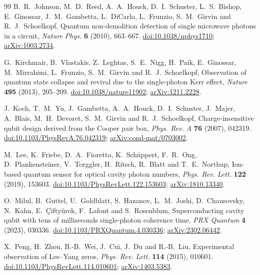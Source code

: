\documentclass[11pt,reqno]{amsart}
\numberwithin{equation}{section}
\theoremstyle{plain}
\theoremstyle{definition}
\theoremstyle{remark}
\begin{document}
\begin{thebibliography}{99}
B.~R.~Johnson, M.~D.~Reed, A.~A.~Houck, D.~I.~Schuster, L.~S.~Bishop, E.~Ginossar, J.~M.~Gambetta, L.~DiCarlo, L.~Frunzio, S.~M.~Girvin and R.~J.~Schoelkopf, Quantum non-demolition detection of single microwave photons in a circuit, \emph{Nature Phys.} \textbf{6} (2010), 663--667.
\href{https://doi.org/10.1038/nphys1710}{doi:10.1038/nphys1710};
\href{https://arxiv.org/abs/1003.2734}{arXiv:1003.2734}.

G.~Kirchmair, B.~Vlastakis, Z.~Leghtas, S.~E.~Nigg, H.~Paik, E.~Ginossar, M.~Mirrahimi, L.~Frunzio, S.~M.~Girvin and R.~J.~Schoelkopf, Observation of quantum state collapse and revival due to the single-photon Kerr effect, \emph{Nature} \textbf{495} (2013), 205--209.
\href{https://doi.org/10.1038/nature11902}{doi:10.1038/nature11902};
\href{https://arxiv.org/abs/1211.2228}{arXiv:1211.2228}.

J.~Koch, T.~M.~Yu, J.~Gambetta, A.~A.~Houck, D.~I.~Schuster, J.~Majer, A.~Blais, M.~H.~Devoret, S.~M.~Girvin and R.~J.~Schoelkopf, Charge-insensitive qubit design derived from the Cooper pair box, \emph{Phys. Rev. A} \textbf{76} (2007), 042319.
\href{https://doi.org/10.1103/PhysRevA.76.042319}{doi:10.1103/PhysRevA.76.042319};
\href{https://arxiv.org/abs/cond-mat/0703002}{arXiv:cond-mat/0703002}.

M.~Lee, K.~Friebe, D.~A.~Fioretto, K.~Sch\"uppert, F.~R.~Ong, D.~Plankensteiner, V.~Torggler, H.~Ritsch, R.~Blatt and T.~E.~Northup, Ion-based quantum sensor for optical cavity photon numbers, \emph{Phys. Rev. Lett.} \textbf{122} (2019), 153603.
\href{https://doi.org/10.1103/PhysRevLett.122.153603}{doi:10.1103/PhysRevLett.122.153603};
\href{https://arxiv.org/abs/1810.13340}{arXiv:1810.13340}.

O.~Milul, B.~Guttel, U.~Goldblatt, S.~Hazanov, L.~M.~Joshi, D.~Chausovsky, N.~Kahn, E.~\c{C}ifty\"urek, F.~Lafont and S.~Rosenblum, Superconducting cavity qubit with tens of milliseconds single-photon coherence time, \emph{PRX Quantum} \textbf{4} (2023), 030336.
\href{https://doi.org/10.1103/PRXQuantum.4.030336}{doi:10.1103/PRXQuantum.4.030336};
\href{https://arxiv.org/abs/2302.06442}{arXiv:2302.06442}.

X.~Peng, H.~Zhou, B.-B.~Wei, J.~Cui, J.~Du and R.-B.~Liu, Experimental observation of Lee--Yang zeros, \emph{Phys. Rev. Lett.} \textbf{114} (2015), 010601.
\href{https://doi.org/10.1103/PhysRevLett.114.010601}{doi:10.1103/PhysRevLett.114.010601};
\href{https://arxiv.org/abs/1403.5383}{arXiv:1403.5383}.


\end{thebibliography}
\end{document}
